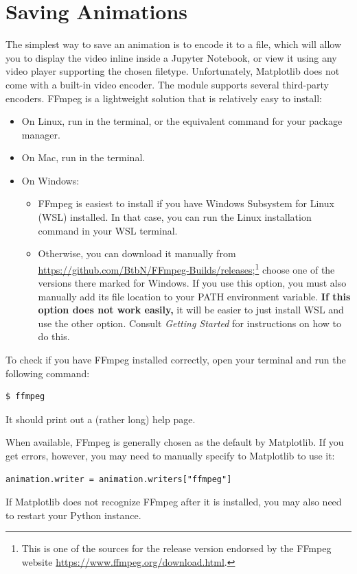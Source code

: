 \section*{Saving Animations}
The simplest way to save an animation is to encode it to a  file, which will allow you to display the video inline inside a Jupyter Notebook, or view it using any video player supporting the chosen filetype.
Unfortunately, Matplotlib does not come with a built-in video encoder.
The  module supports several third-party encoders.
FFmpeg is a lightweight solution that is relatively easy to install:
\begin{itemize}
\item On Linux, run  in the terminal, or the equivalent command for your package manager.
\item On Mac, run  in the terminal.
\item On Windows:
	\begin{itemize}
	\item FFmpeg is easiest to install if you have Windows Subsystem for Linux (WSL) installed. In that case, you can run the Linux installation command in your WSL terminal.
	\item Otherwise, you can download it manually from \url{https://github.com/BtbN/FFmpeg-Builds/releases};\footnote{This is one of the sources for the release version endorsed by the FFmpeg website \url{https://www.ffmpeg.org/download.html}.}
	choose one of the versions there marked for Windows.
	If you use this option, you must also manually add its file location to your PATH environment variable.
	\textbf{If this option does not work easily,} it will be easier to just install WSL and use the other option.
	Consult \emph{Getting Started} for instructions on how to do this.
	\end{itemize}
\end{itemize}
To check if you have FFmpeg installed correctly, open your terminal and run the following command:
\begin{lstlisting}
$ ffmpeg
\end{lstlisting}
It should print out a (rather long) help page.

When available, FFmpeg is generally chosen as the default by Matplotlib.
If you get errors, however, you may need to manually specify to Matplotlib to use it:
\begin{lstlisting}
animation.writer = animation.writers["ffmpeg"]
\end{lstlisting}
If Matplotlib does not recognize FFmpeg after it is installed, you may also need to restart your Python instance.

